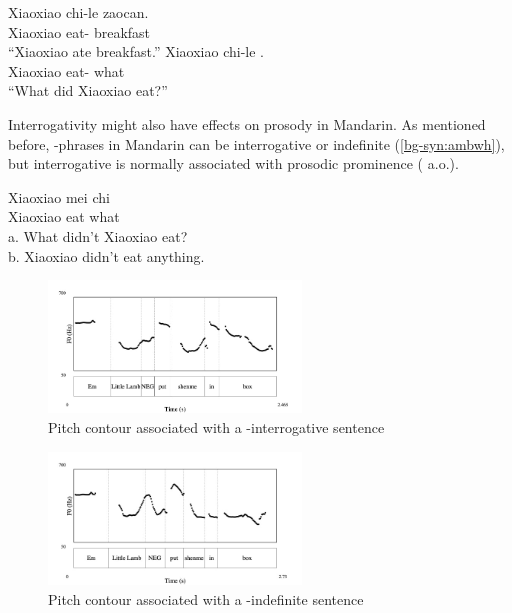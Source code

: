 \gll Xiaoxiao	chi-le zaocan.\\
Xiaoxiao eat-\Asp{} breakfast \\
``Xiaoxiao ate breakfast.''
\eex
{}
\gll Xiaoxiao	chi-le .\\
Xiaoxiao eat-\Asp{} what \\
``What did Xiaoxiao eat?''
\eex


Interrogativity might also have effects on prosody in Mandarin. As mentioned before, \twh-phrases in Mandarin can be interrogative or indefinite (\ref{bg-syn:ambwh}), but interrogative \twh{} is normally associated with prosodic prominence (\cite{hu2002prosody, dong2009, yangyang2018} a.o.).

\gll Xiaoxiao	mei	chi	\\
Xiaoxiao	\Neg{}	eat	what\\
a.	What didn't Xiaoxiao eat?\\
b.	Xiaoxiao didn't eat anything.\\
\eex

\begin{figure}[H]
    \centering
    \includegraphics[width=0.6\textwidth]{figures/pitch-FC1wh.jpg}
    \caption{Pitch contour associated with a \twh-interrogative sentence}
    \label{fig:man:wh1}
\end{figure}

\begin{figure}[H]
    \centering
    \includegraphics[width=0.6\textwidth]{figures/pitch-FC0wh.jpg}
    \caption{Pitch contour associated with a \twh-indefinite sentence}
    \label{fig:man:wh0}
\end{figure}

